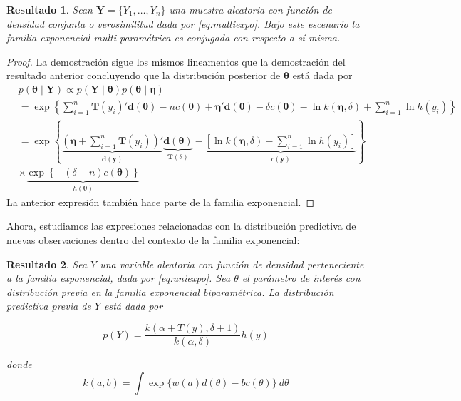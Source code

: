 \documentclass[
  10pt,
  spanish,
]{book}
\newtheorem{proposition}{Resultado}[chapter]
\theoremstyle{definition}
\theoremstyle{definition}
\theoremstyle{definition}
\theoremstyle{definition}
\theoremstyle{remark}
\begin{document}
\begin{proposition}
\protect\hypertarget{prp:unnamed-chunk-7}{}{\label{prp:unnamed-chunk-7} }Sean \(\mathbf{Y}=\{Y_1, \ldots, Y_n\}\) una muestra aleatoria con función de densidad conjunta o verosimilitud dada por \eqref{eq:multiexpo}. Bajo este escenario la familia exponencial multi-paramétrica es conjugada con respecto a sí misma.
\end{proposition}

\begin{proof}
{}La demostración sigue los mismos lineamentos que la demostración del resultado anterior concluyendo que la distribución posterior de \(\boldsymbol \theta\) está dada por
\begin{align*}
&p(\boldsymbol \theta\mid \mathbf{Y}) \propto p(\mathbf{Y} \mid \boldsymbol \theta)p(\boldsymbol \theta\mid \boldsymbol \eta)\\
&= \exp\left\{\sum_{i=1}^n\mathbf{T}(y_i)'\mathbf{d}(\boldsymbol \theta) - nc(\boldsymbol \theta) + \boldsymbol \eta' \mathbf{d}(\boldsymbol \theta) - \delta c(\boldsymbol \theta) - \ln k(\boldsymbol \eta,\delta) +\sum_{i=1}^n\ln h(y_i)\right\}\\
& =\exp\left\{\underbrace{\left(\boldsymbol \eta+\sum_{i=1}^n\mathbf{T}(y_i)\right)'}_{\mathbf{d}(\mathbf{y})}
\underbrace{\mathbf{d}(\boldsymbol \theta)}_{\mathbf{T}(\theta)} - \underbrace{\left[\ln k(\boldsymbol \eta,\delta)-\sum_{i=1}^n\ln h(y_i)\right]}_{c(\mathbf{y})}\right\} \\
&  \times \underbrace{\exp\left\{-(\delta+n)c(\boldsymbol \theta)\right\}}_{h(\boldsymbol \theta)}
\end{align*}
La anterior expresión también hace parte de la familia exponencial.
\end{proof}

Ahora, estudiamos las expresiones relacionadas con la distribución
predictiva de nuevas observaciones dentro del contexto de la familia
exponencial:

\begin{proposition}
\protect\hypertarget{prp:unnamed-chunk-9}{}{\label{prp:unnamed-chunk-9} }Sea \(Y\) una variable aleatoria con función de densidad perteneciente a la familia exponencial, dada por \eqref{eq:uniexpo}. Sea \(\theta\) el parámetro de interés con distribución previa en la familia exponencial biparamétrica. La distribución predictiva previa de \(Y\) está dada por

\begin{equation}
p(Y)=\frac{k(\alpha+T(y),\delta+1)}{k(\alpha,\delta)}h(y)
\end{equation}

donde
\begin{equation*}
k(a,b)=\int \exp\{w(a) d(\theta)-b c(\theta)\}\ d\theta
\end{equation*}
\end{proposition}
\end{document}
